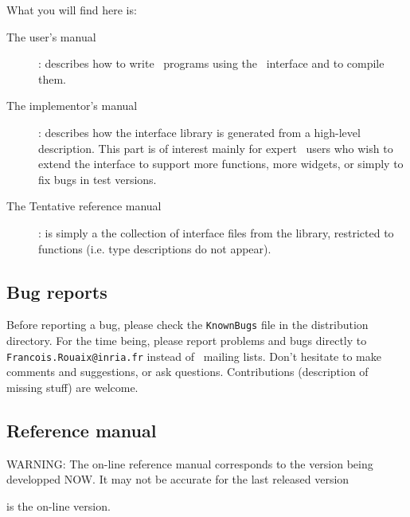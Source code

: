What you will find here is:
\begin{description}
\item[The user's manual] : describes how to write \caml\ programs using the
\tk\ interface and to compile them. 
\item[The implementor's manual] : describes how the interface library is
generated from a high-level description. This part is of interest mainly for
expert \tk\ users who wish to extend the interface to support more
functions, more widgets, or simply to fix bugs in test versions.
\item[The Tentative reference manual] : is simply a the collection of
interface files from the library, restricted to functions (i.e. type
descriptions do not appear). 
\end{description}

\section*{Bug reports}
Before reporting a bug, please check the \verb|KnownBugs| file in the
distribution directory.
For the time being, please report problems and bugs directly to
\verb|Francois.Rouaix@inria.fr| instead of \caml\ mailing lists.
Don't hesitate to make comments and suggestions, or ask questions.
Contributions (description of missing stuff) are welcome.


\tableofcontents





\begin{htmlonly}
\chapter{Reference manual}
{\Large WARNING: The on-line reference manual corresponds to the version
being developped NOW. It may not be accurate for the last released version}

is the on-line version.
\end{htmlonly}





\appendix



